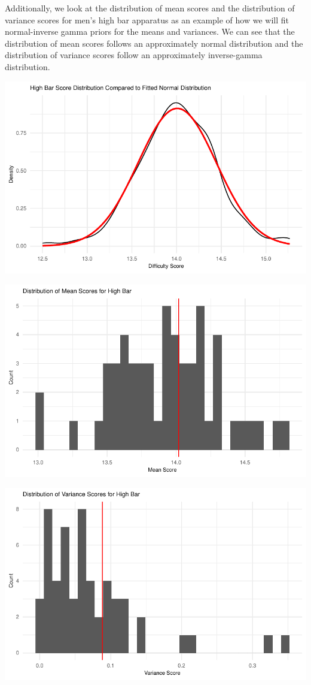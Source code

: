 \documentclass[
  letterpaper,
  DIV=11,
  numbers=noendperiod]{scrartcl}
\begin{document}
Additionally, we look at the distribution of mean scores and the
distribution of variance scores for men's high bar apparatus as an
example of how we will fit normal-inverse gamma priors for the means and
variances. We can see that the distribution of mean scores follows an
approximately normal distribution and the distribution of variance
scores follow an approximately inverse-gamma distribution.

\includegraphics{Main_files/figure-pdf/highbar-fit-1.pdf}

\includegraphics{Main_files/figure-pdf/scoremeans-var-1.pdf}

\includegraphics{Main_files/figure-pdf/scoremeans-var-2.pdf}
\end{document}
